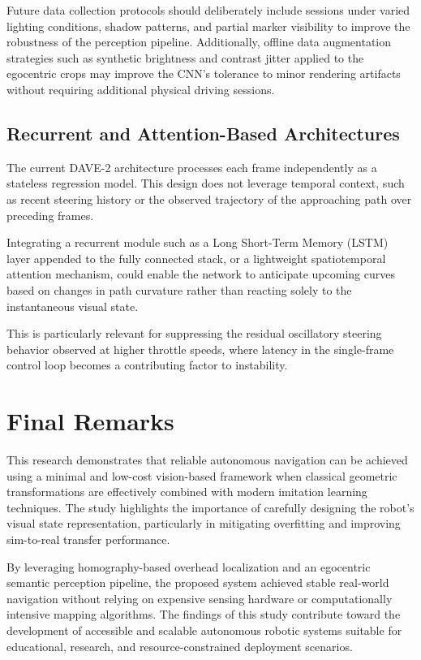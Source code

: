 Future data collection protocols should deliberately include sessions under varied lighting conditions, shadow patterns, and partial marker visibility to improve the robustness of the perception pipeline. Additionally, offline data augmentation strategies such as synthetic brightness and contrast jitter applied to the egocentric crops may improve the CNN's tolerance to minor rendering artifacts without requiring additional physical driving sessions.

\subsection{Recurrent and Attention-Based Architectures}

The current DAVE-2 architecture processes each frame independently as a stateless regression model. This design does not leverage temporal context, such as recent steering history or the observed trajectory of the approaching path over preceding frames.

Integrating a recurrent module such as a Long Short-Term Memory (LSTM) layer appended to the fully connected stack, or a lightweight spatiotemporal attention mechanism, could enable the network to anticipate upcoming curves based on changes in path curvature rather than reacting solely to the instantaneous visual state.

This is particularly relevant for suppressing the residual oscillatory steering behavior observed at higher throttle speeds, where latency in the single-frame control loop becomes a contributing factor to instability.

\section{Final Remarks}

This research demonstrates that reliable autonomous navigation can be achieved using a minimal and low-cost vision-based framework when classical geometric transformations are effectively combined with modern imitation learning techniques. The study highlights the importance of carefully designing the robot's visual state representation, particularly in mitigating overfitting and improving sim-to-real transfer performance.

By leveraging homography-based overhead localization and an egocentric semantic perception pipeline, the proposed system achieved stable real-world navigation without relying on expensive sensing hardware or computationally intensive mapping algorithms. The findings of this study contribute toward the development of accessible and scalable autonomous robotic systems suitable for educational, research, and resource-constrained deployment scenarios.
